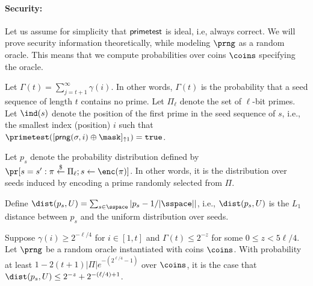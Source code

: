 \paragraph{Security:} 

Let us assume for simplicity that ${\sf primetest}$ is ideal, i.e, always correct. We will prove security information theoretically, while modeling $\prng$ as a random oracle. This means that we compute probabilities over coins $\coins$ specifying the oracle.

Let $\Gamma(t) = \sum_{j=t+1}^{\infty} \gamma(i)$. In other words, $\Gamma(t)$ is the probability that a seed sequence of length $t$ contains no prime. Let $\Pi_{\ell}$ denote the set of $\ell$-bit primes. Let $\ind(s)$ denote the position of the first prime in the seed sequence of $s$, i.e., the smallest index (position) $i$ such that $\primetest([{\sf prng}(\sigma, i) \oplus \mask]_{\uparrow 1}) = {\tt true}$.

Let $p_s$ denote the probability distribution defined by $\pr[s = s': \pi \stackrel{\$}{\leftarrow} \Pi_{\ell}; s \leftarrow \enc(\pi)]$. In other words, it is the distribution over seeds induced by encoding a prime randomly selected from $\Pi$.

Define $\dist(p_s, U) = \sum_{s \in \sspace} | p_s - 1 / |\sspace| |$, i.e., $\dist(p_s, U)$ is the $L_1$ distance between $p_s$ and the uniform distribution over seeds.

\begin{lemma}
 Suppose $\gamma(i) \geq 2^{-\ell / 4}$ for $i \in [1,t]$ and $\Gamma(t) \leq 2^{-z}$ for some $0 \leq z < 5\ell / 4$. Let $\prng$ be a random oracle instantiated with coins $\coins$. With probability at least $1 - 2(t+1)|\Pi|e^{-(2^{\ell/4} - 1)}$ over $\coins$, it is the case that $\dist(p_s, U) \leq 2^{-z} + 2^{-(\ell / 4) + 1}$.
\end{lemma}

